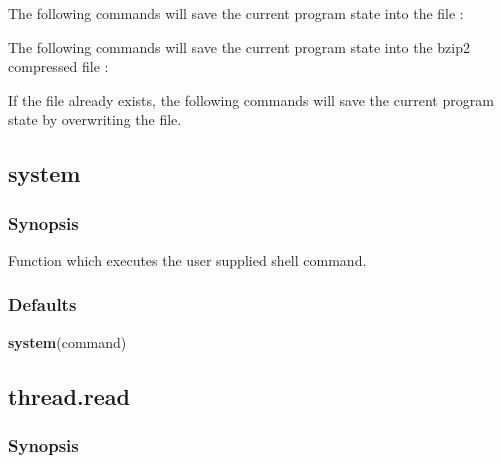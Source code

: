 The following commands will save the current program state into the file 
:





The following commands will save the current program state into the bzip2  compressed file
:







If the file 
 already exists, the following commands will save the current program
state by overwriting the file.





\newpage

\subsection{system}


\subsubsection{Synopsis}

Function which executes the user supplied shell command.

\subsubsection{Defaults}

\textsf{\textbf{system}(command)}



\newpage

\subsection{thread.read}


\subsubsection{Synopsis}

